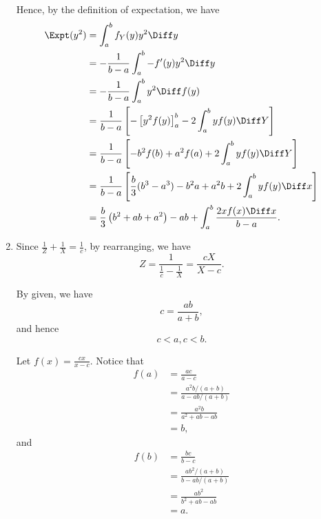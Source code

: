 \begin{enumerate}
          Hence, by the definition of expectation, we have
          \begin{align*}
              \Expt(y^2) & = \int_{a}^{b} f_{Y}(y) y^2 \Diff y                                                                 \\
                         & = -\frac{1}{b - a} \int_{a}^{b} - f'(y) y^2 \Diff y                                                 \\
                         & = -\frac{1}{b - a} \int_{a}^{b} y^2 \Diff f(y)                                                      \\
                         & = \frac{1}{b - a} \left[-\left[y^2 f(y)\right]_{a}^{b} - 2\int_{a}^{b} y f(y) \Diff Y\right]        \\
                         & = \frac{1}{b - a} \left[- b^2 f(b) + a^2 f(a) + 2\int_{a}^{b} y f(y) \Diff Y\right]                 \\
                         & = \frac{1}{b - a} \left[\frac{b}{3} (b^3 - a^3) - b^2a + a^2b + 2\int_{a}^{b} y f(y) \Diff x\right] \\
                         & = \frac{b}{3} \left(b^2 + ab + a^2\right) - ab + \int_{a}^{b} \frac{2xf(x) \Diff x}{b - a}.
          \end{align*}
    \item Since \(\frac{1}{Z} + \frac{1}{X} = \frac{1}{c}\), by rearranging, we have
          \[
              Z = \frac{1}{\frac{1}{c} - \frac{1}{X}} = \frac{cX}{X - c}.
          \]

          By given, we have
          \[
              c = \frac{ab}{a + b},
          \]
          and hence
          \[
              c < a, c < b.
          \]

          Let \(f(x) = \frac{cx}{x - c}\). Notice that
          \begin{align*}
              f(a) & = \frac{ac}{a - c}                        \\
                   & = \frac{a^2b / (a + b)}{a - ab / (a + b)} \\
                   & = \frac{a^2 b}{a^2 + ab - ab}             \\
                   & = b,
          \end{align*}
          and
          \begin{align*}
              f(b) & = \frac{bc}{b - c}                        \\
                   & = \frac{ab^2 / (a + b)}{b - ab / (a + b)} \\
                   & = \frac{ab^2}{b^2 + ab - ab}              \\
                   & = a.
          \end{align*}


\end{enumerate}

